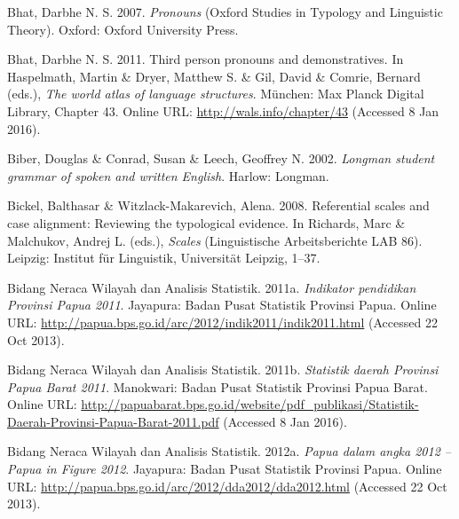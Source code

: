 \begin{styleCitaviBibliographyEntry}
Bhat, Darbhe N. S. 2007. \textit{Pronouns} (Oxford Studies in Typology and Linguistic Theory). Oxford: Oxford University Press.
\end{styleCitaviBibliographyEntry}

\begin{styleCitaviBibliographyEntry}
Bhat, Darbhe N. S. 2011. Third person pronouns and demonstratives. In Haspelmath, Martin \& Dryer, Matthew S. \& Gil, David \& Comrie, Bernard (eds.), \textit{The world atlas of language structures}. München: Max Planck Digital Library, Chapter 43. Online URL: \url{http://wals.info/chapter/43} (Accessed 8 Jan 2016).
\end{styleCitaviBibliographyEntry}

\begin{styleCitaviBibliographyEntry}
Biber, Douglas \& Conrad, Susan \& Leech, Geoffrey N. 2002. \textit{Longman student grammar of spoken and written English}. Harlow: Longman.
\end{styleCitaviBibliographyEntry}

\begin{styleCitaviBibliographyEntry}
Bickel, Balthasar \& Witzlack-Makarevich, Alena. 2008. Referential scales and case alignment: Reviewing the typological evidence. In Richards, Marc \& Malchukov, Andrej L. (eds.), \textit{Scales} (Linguistische Arbeitsberichte LAB 86). Leipzig: Institut für Linguistik, Universität Leipzig, 1–37.
\end{styleCitaviBibliographyEntry}

\begin{styleCitaviBibliographyEntry}
Bidang Neraca Wilayah dan Analisis Statistik. 2011a. \textit{Indikator pendidikan Provinsi Papua 2011}. Jayapura: Badan Pusat Statistik Provinsi Papua. Online URL: \url{http://papua.bps.go.id/arc/2012/indik2011/indik2011.html} (Accessed 22 Oct 2013).
\end{styleCitaviBibliographyEntry}

\begin{styleCitaviBibliographyEntry}
Bidang Neraca Wilayah dan Analisis Statistik. 2011b. \textit{Statistik daerah Provinsi Papua Barat 2011}. Manokwari: Badan Pusat Statistik Provinsi Papua Barat. Online URL: \url{http://papuabarat.bps.go.id/website/pdf_publikasi/Statistik-Daerah-Provinsi-Papua-Barat-2011.pdf} (Accessed 8 Jan 2016).
\end{styleCitaviBibliographyEntry}

\begin{styleCitaviBibliographyEntry}
Bidang Neraca Wilayah dan Analisis Statistik. 2012a. \textit{Papua dalam angka 2012 – Papua in Figure 2012}. Jayapura: Badan Pusat Statistik Provinsi Papua. Online URL: \url{http://papua.bps.go.id/arc/2012/dda2012/dda2012.html} (Accessed 22 Oct 2013).
\end{styleCitaviBibliographyEntry}

